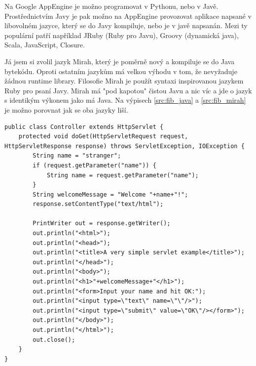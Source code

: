 \documentclass[bc,male,java,dept456]{diploma}						%
\begin{document}

Na Google AppEngine je možno programovat v Pythonu, nebo v Javě. Prostřednictvím Javy je pak možno na AppEngine provozovat aplikace napsané v libovolném jazyce, který se do Javy kompiluje, nebo je v javě napsanán. Mezi ty populární patří například JRuby (Ruby pro Javu), Groovy (dynamická java), Scala, JavaScript, Closure. 

Já jsem si zvolil jazyk Mirah, který je poměrně nový a kompiluje se do Java bytekódu. Oproti ostatním jazykům má velkou výhodu v tom, že nevyžaduje žádnou runtime library. Filosofie Mirah je použít syntaxi inspirovanou jazykem Ruby pro psaní Javy. Mirah má "pod kapotou" čistou Javu a nic víc a jde o jazyk s identikým výkonem jako má Java. Na výpisech \ref{src:fib_java} a \ref{src:fib_mirah} je možno porovnat jak se oba jazyky liší.



\begin{lstlisting}[label=src:fib_java,caption=Hello World servlet v Javě]
public class Controller extends HttpServlet {
	protected void doGet(HttpServletRequest request, HttpServletResponse response) throws ServletException, IOException {
		String name = "stranger";
		if (request.getParameter("name")) {
			String name = request.getParameter("name");
		}
		String welcomeMessage = "Welcome "+name+"!";
		response.setContentType("text/html");
 
		PrintWriter out = response.getWriter();
		out.println("<html>");
		out.println("<head>");
		out.println("<title>A very simple servlet example</title>");
		out.println("</head>");
		out.println("<body>");
		out.println("<h1>"+welcomeMessage+"</h1>");
		out.println("<form>Input your name and hit OK:");
		out.println("<input type=\"text\" name=\"\"/>");
		out.println("<input type=\"submit\" value=\"OK\"/></form>");
		out.println("</body>");
		out.println("</html>");
		out.close();
	}
} 
\end{lstlisting}
\end{document}

